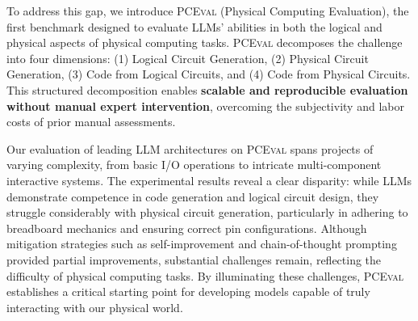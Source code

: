 \documentclass{article} %
\begin{document}

To address this gap, we introduce \textsc{PCEval} (Physical Computing Evaluation), the first benchmark designed to evaluate LLMs' abilities in both the logical and physical aspects of physical computing tasks.
\textsc{PCEval} decomposes the challenge into four dimensions:
(1) Logical Circuit Generation, (2) Physical Circuit Generation, (3) Code from Logical Circuits, and (4) Code from Physical Circuits.
This structured decomposition enables \textbf{scalable and reproducible evaluation without manual expert intervention}, overcoming the subjectivity and labor costs of prior manual assessments.

Our evaluation of leading LLM architectures on \textsc{PCEval} spans projects of varying complexity, from basic I/O operations to intricate multi-component interactive systems.
The experimental results reveal a clear disparity: while LLMs demonstrate competence in code generation and logical circuit design, they struggle considerably with physical circuit generation, particularly in adhering to breadboard mechanics and ensuring correct pin configurations.
Although mitigation strategies such as self-improvement and chain-of-thought prompting provided partial improvements, substantial challenges remain, reflecting the difficulty of physical computing tasks.
By illuminating these challenges, \textsc{PCEval} establishes a critical starting point for developing models capable of truly interacting with our physical world.
\end{document}
